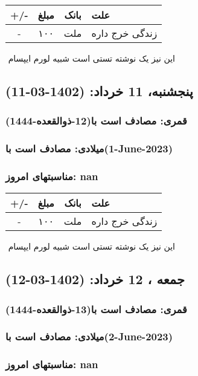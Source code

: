 \documentclass{article}
\newcommand{\rnote}[1]{\marginpar{\textcolor{color}{\StrSubstitute{\##1}{ }{\_}}}}
\newcommand{\myRow}[4]{
    #1 & #2 & #3 & #4 \\ \hline
}
\begin{document}
\begin{tabular}{ | c | c | c | p{5cm} |}
    \hline
    \myRow{ +/- }{مبلغ}{بانک}{علت}
    \myRow{-}{۱۰۰}{ملت}{زندگی خرج داره}
\end{tabular}
\newline
\newline

‌
\rnote{تست}
این نیز یک نوشته تستی است شبیه لورم ایپسام




\newpage
{}
\textcolor{color}{
\section{ پنجشنبه، 11 خرداد: (1402-03-11) }
\subsubsection*{قمری: مصادف است با(12-ذوالقعده-1444)} 
\subsubsection*{میلادی: مصادف است با(1-June-2023)}
\subsubsection*{مناسبتهای امروز: nan}
}


\begin{tabular}{ | c | c | c | p{5cm} |}
    \hline
    \myRow{ +/- }{مبلغ}{بانک}{علت}
    \myRow{-}{۱۰۰}{ملت}{زندگی خرج داره}
\end{tabular}
\newline
\newline

‌
\rnote{تست}
این نیز یک نوشته تستی است شبیه لورم ایپسام




\newpage
{}
\textcolor{color}{
\section{ جمعه ، 12 خرداد: (1402-03-12) }
\subsubsection*{قمری: مصادف است با(13-ذوالقعده-1444)} 
\subsubsection*{میلادی: مصادف است با(2-June-2023)}
\subsubsection*{مناسبتهای امروز: nan}
}
\end{document}

